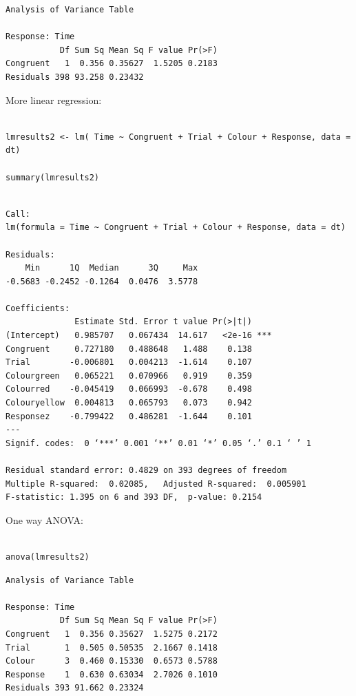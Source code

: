 \documentclass{article}
\begin{document}
\begin{verbatim}
Analysis of Variance Table

Response: Time
           Df Sum Sq Mean Sq F value Pr(>F)
Congruent   1  0.356 0.35627  1.5205 0.2183
Residuals 398 93.258 0.23432
\end{verbatim}

More linear regression:

\begin{verbatim}

lmresults2 <- lm( Time ~ Congruent + Trial + Colour + Response, data = dt)

summary(lmresults2)

\end{verbatim}

\begin{verbatim}

Call:
lm(formula = Time ~ Congruent + Trial + Colour + Response, data = dt)

Residuals:
    Min      1Q  Median      3Q     Max 
-0.5683 -0.2452 -0.1264  0.0476  3.5778 

Coefficients:
              Estimate Std. Error t value Pr(>|t|)    
(Intercept)   0.985707   0.067434  14.617   <2e-16 ***
Congruent     0.727180   0.488648   1.488    0.138    
Trial        -0.006801   0.004213  -1.614    0.107    
Colourgreen   0.065221   0.070966   0.919    0.359    
Colourred    -0.045419   0.066993  -0.678    0.498    
Colouryellow  0.004813   0.065793   0.073    0.942    
Responsez    -0.799422   0.486281  -1.644    0.101    
---
Signif. codes:  0 ‘***’ 0.001 ‘**’ 0.01 ‘*’ 0.05 ‘.’ 0.1 ‘ ’ 1

Residual standard error: 0.4829 on 393 degrees of freedom
Multiple R-squared:  0.02085,	Adjusted R-squared:  0.005901 
F-statistic: 1.395 on 6 and 393 DF,  p-value: 0.2154
\end{verbatim}

One way ANOVA:

\begin{verbatim}

anova(lmresults2)

\end{verbatim}

\begin{verbatim}
Analysis of Variance Table

Response: Time
           Df Sum Sq Mean Sq F value Pr(>F)
Congruent   1  0.356 0.35627  1.5275 0.2172
Trial       1  0.505 0.50535  2.1667 0.1418
Colour      3  0.460 0.15330  0.6573 0.5788
Response    1  0.630 0.63034  2.7026 0.1010
Residuals 393 91.662 0.23324
\end{verbatim}
\end{document}
